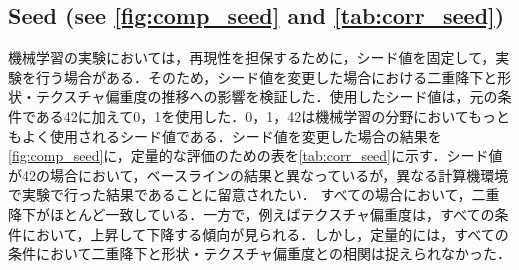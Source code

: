 \begin{table}[htb]
    \centering
    \caption[Correlation coefficients and scores in Phase 1, 2 and Phase 3 on different label noise.]{
    Correlation coefficients and scores in Phase 1, 2 and Phase 3 on different label noise. It shows the correlation coefficients (SB, TB) between test error and shape/texture bias and the score calculated from these two correlation coefficients.
    }
    \label{tab:corr_ln}
\end{table}

\newpage

\subsection[Seed]{Seed (see \cref{fig:comp_seed} and \cref{tab:corr_seed})}
機械学習の実験においては，再現性を担保するために，シード値を固定して，実験を行う場合がある．そのため，シード値を変更した場合における二重降下と形状・テクスチャ偏重度の推移への影響を検証した．使用したシード値は，元の条件である42に加えて0，1を使用した．0，1，42は機械学習の分野においてもっともよく使用されるシード値である．シード値を変更した場合の結果を\cref{fig:comp_seed}に，定量的な評価のための表を\cref{tab:corr_seed}に示す．シード値が42の場合において，ベースラインの結果と異なっているが，異なる計算機環境で実験で行った結果であることに留意されたい．
すべての場合において，二重降下がほとんど一致している．一方で，例えばテクスチャ偏重度は，すべての条件において，上昇して下降する傾向が見られる．しかし，定量的には，すべての条件において二重降下と形状・テクスチャ偏重度との相関は捉えられなかった．

